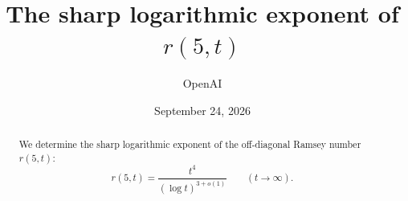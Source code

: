 \documentclass[11pt]{article}
\title{The sharp logarithmic exponent of \(r(5,t)\)}
\author{OpenAI}
\date{September 24, 2026}
\theoremstyle{definition}
\theoremstyle{remark}
\begin{document}
\maketitle
\begin{abstract}
We determine the sharp logarithmic exponent of the off-diagonal Ramsey
number \(r(5,t)\):
\[
 r(5,t)=\frac{t^4}{(\log t)^{3+o(1)}}
 \qquad (t\longrightarrow\infty).
\]
\end{abstract}
\tableofcontents













\end{document}
